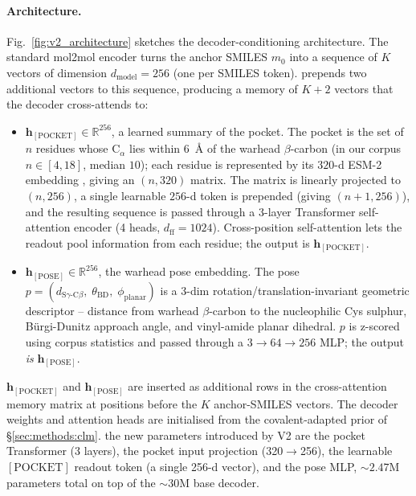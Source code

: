 \paragraph{Architecture.}
Fig.~\ref{fig:v2_architecture} sketches the \Cvcond{} decoder-conditioning architecture. The standard mol2mol encoder turns the anchor SMILES $m_0$ into a sequence of $K$ vectors of dimension $d_{\text{model}}{=}256$ (one per SMILES token). \Cvcond{} prepends two additional vectors to this sequence, producing a memory of $K{+}2$ vectors that the decoder cross-attends to:
\begin{itemize}
  \item $\mathbf{h}_{[\text{POCKET}]} \in \mathbb{R}^{256}$, a learned summary of the pocket. The pocket is the set of $n$ residues whose C$_\alpha$ lies within $6$~\r{A} of the warhead $\beta$-carbon (in our corpus $n \in [4, 18]$, median $10$); each residue is represented by its $320$-d ESM-2 embedding \cite{lin2023esm2}, giving an $(n, 320)$ matrix. The matrix is linearly projected to $(n, 256)$, a single learnable $256$-d token is prepended (giving $(n{+}1, 256)$), and the resulting sequence is passed through a 3-layer Transformer self-attention encoder (4 heads, $d_{\text{ff}}{=}1024$). Cross-position self-attention lets the readout pool information from each residue; the output is $\mathbf{h}_{[\text{POCKET}]}$.
  \item $\mathbf{h}_{[\text{POSE}]} \in \mathbb{R}^{256}$, the warhead pose embedding. The pose $p = (d_{\text{S}\gamma\text{-}\text{C}\beta},\; \theta_{\text{BD}},\; \phi_{\text{planar}})$ is a 3-dim rotation/translation-invariant geometric descriptor -- distance from warhead $\beta$-carbon to the nucleophilic Cys sulphur, B\"urgi-Dunitz approach angle, and vinyl-amide planar dihedral. $p$ is z-scored using corpus statistics and passed through a $3 \to 64 \to 256$ MLP; the output \emph{is} $\mathbf{h}_{[\text{POSE}]}$.
\end{itemize}
$\mathbf{h}_{[\text{POCKET}]}$ and $\mathbf{h}_{[\text{POSE}]}$ are inserted as additional rows in the cross-attention memory matrix at positions before the $K$ anchor-SMILES vectors. The decoder weights and attention heads are initialised from the covalent-adapted prior of \S\ref{sec:methods:clm}. the new parameters introduced by V2 are the pocket Transformer (3 layers), the pocket input projection (320$\to$256), the learnable $[\text{POCKET}]$ readout token (a single 256-d vector), and the pose MLP, $\sim$$2.47$M parameters total on top of the $\sim$$30$M base decoder.

